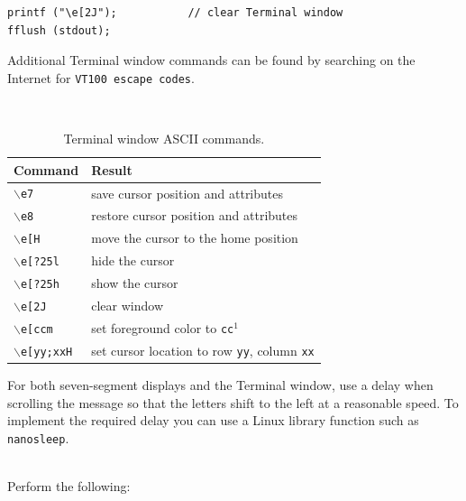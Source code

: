 \documentclass[epsfig,10pt,fullpage]{article}
\begin{document}
\begin{lstlisting}
printf ("\e[2J");			// clear Terminal window
fflush (stdout);
\end{lstlisting}

\noindent
Additional Terminal window commands can be found by searching on the Internet for
\texttt{VT100 escape codes}.
\begin{table}[h]
\caption{Terminal window ASCII commands.}
~\\
\centering
\label{tab:vt100}
\begin{tabular}{l|l}
		  {\bf Command} & {\bf Result} \\ \hline
		  \rule{0cm}{.375cm}\texttt{$\backslash$e7} & save cursor position and attributes\\
		  \texttt{$\backslash$e8} & restore cursor position and attributes\\
		  \texttt{$\backslash$e[H} & move the cursor to the home position\\
		  \texttt{$\backslash$e[?25l} & hide the cursor \\
		  \texttt{$\backslash$e[?25h} & show the cursor \\
		  \texttt{$\backslash$e[2J} & clear window \\
		  \texttt{$\backslash$e[ccm} & set foreground color to \texttt{cc}$^1$ \\
		  \texttt{$\backslash$e[yy;xxH} & set cursor location to row \texttt{yy}, column \texttt{xx}
		  
\end{tabular}
\end{table}

\noindent
For both seven-segment displays and the Terminal window, use a delay when scrolling the message 
so that the letters shift to the left at a reasonable speed. To implement the required delay you 
can use a Linux library function such as \texttt{nanosleep}. 

~\\
\noindent
Perform the following:
\end{document}
